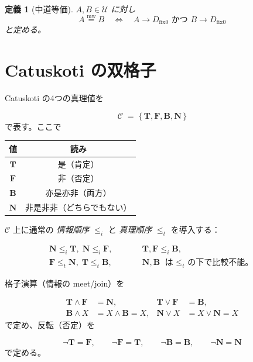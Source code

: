 \documentclass[12pt,a4paper]{article}
\newcommand{\dfix}{D_{\mathrm{fix}0}} %
\newcommand{\mw}{\mathrel{\overset{\mathrm{mw}}{=}}} %
\newtheorem{definition}{定義}[section]
\begin{document}
\begin{definition}[中道等価]
$A,B\in\mathcal{U}$ に対し
\[
A\mw B
\quad\Longleftrightarrow\quad
A\to\dfix\text{ かつ }B\to\dfix
\]
と定める。
\end{definition}

\section{Catuskoti の双格子}

Catuskoti の4つの真理値を

$$
\mathcal{C}\;=\;\{\,\mathbf{T},\mathbf{F},
                 \mathbf{B},\mathbf{N}\,\}
$$
で表す。ここで

\begin{center}
\begin{tabular}{c|c}
値 & 読み \\ \hline
$\mathbf{T}$ & 是（肯定） \\
$\mathbf{F}$ & 非（否定） \\
$\mathbf{B}$ & 亦是亦非（両方） \\
$\mathbf{N}$ & 非是非非（どちらでもない） \\
\end{tabular}
\end{center}

$\mathcal{C}$ 上に通常の \emph{情報順序} $\le_i$ と \emph{真理順序} $\le_t$ を導入する：

$$
\begin{array}{ccl}
\mathbf{N}\le_i\mathbf{T},\;\mathbf{N}\le_i\mathbf{F},
&\qquad&
\mathbf{T},\mathbf{F}\le_i\mathbf{B},\\[2mm]
\mathbf{F}\le_t\mathbf{N},\;
\mathbf{T}\le_t\mathbf{B},
&\qquad&
\mathbf{N},\mathbf{B}\text{ は $\le_t$ の下で比較不能。}
\end{array}
$$

格子演算（情報の meet/join）を

$$
\begin{aligned}
\mathbf{T}\wedge\mathbf{F}&=\mathbf{N}, &
\mathbf{T}\vee\mathbf{F}&=\mathbf{B},\\
\mathbf{B}\wedge X&=X\wedge\mathbf{B}=X, &
\mathbf{N}\vee X&=X\vee\mathbf{N}=X
\end{aligned}
$$
で定め、反転（否定）を

$$
\neg\mathbf{T}=\mathbf{F},\qquad
\neg\mathbf{F}=\mathbf{T},\qquad
\neg\mathbf{B}=\mathbf{B},\qquad
\neg\mathbf{N}=\mathbf{N}
$$
で定める。
\end{document}
